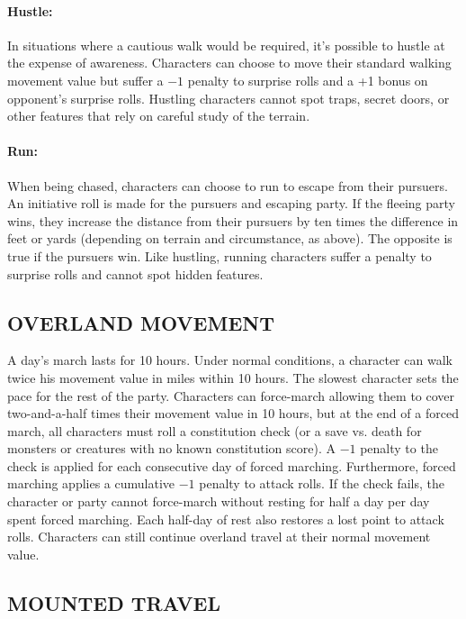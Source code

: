 \begin{multicols}{2}
\paragraph{Hustle:} In situations where a cautious walk would be required, it's possible to hustle at the expense of awareness.  Characters can choose to move their standard walking movement value but suffer a $-1$ penalty to surprise rolls and a +1 bonus on opponent's surprise rolls.  Hustling characters cannot spot traps, secret doors, or other features that rely on careful study of the terrain.

\paragraph{Run:} When being chased, characters can choose to run to escape from their pursuers.  An initiative roll is made for the pursuers and escaping party.  If the fleeing party wins, they increase the distance from their pursuers by ten times the difference in feet or yards (depending on terrain and circumstance, as above).  The opposite is true if the pursuers win.  Like hustling, running characters suffer a penalty to surprise rolls and cannot spot hidden features.

\subsection{OVERLAND MOVEMENT}

A day's march lasts for 10 hours.  Under normal conditions, a character can walk twice his movement value in miles within 10 hours.  The slowest character sets the pace for the rest of the party.  Characters can force-march allowing them to cover two-and-a-half times their movement value in 10 hours, but at the end of a forced march, all characters must roll a constitution check (or a save vs. death for monsters or creatures with no known constitution score).  A $-1$ penalty to the check is applied for each consecutive day of forced marching.  Furthermore, forced marching applies a cumulative $-1$ penalty to attack rolls.  If the check fails, the character or party cannot force-march without resting for half a day per day spent forced marching.  Each half-day of rest also restores a lost point to attack rolls.  Characters can still continue overland travel at their normal movement value.  

\subsection{MOUNTED TRAVEL}


\end{multicols}
